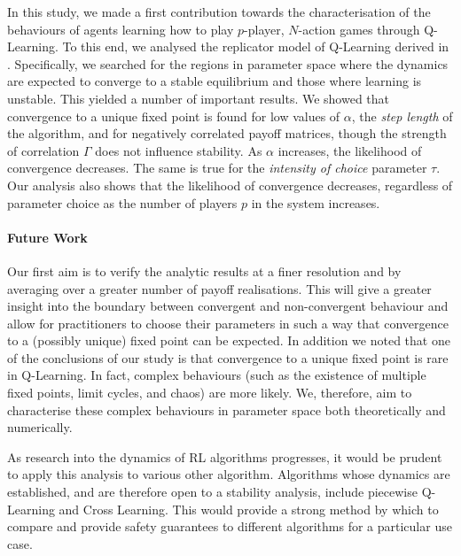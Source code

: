 \documentclass[sigconf,anonymous]{aamas}
\begin{document}
In this study, we made a first contribution towards the
characterisation of the behaviours of agents learning how to play
$p$-player, $N$-action games through Q-Learning. To this end, we
analysed the replicator model of Q-Learning derived in \cite{Tuyls2006AnGames}. Specifically, we searched for the regions in parameter space
where the dynamics are expected to converge to a stable equilibrium
and those where learning is unstable. This yielded a number of
important results. We showed that convergence to a unique fixed point is
found for low values of $\alpha$, the \textit{step length} of the
algorithm, and for negatively correlated payoff matrices, though the
strength of correlation $\Gamma$ does not influence stability. As
$\alpha$ increases, the likelihood of convergence decreases. The same
is true for the \textit{intensity of choice} parameter $\tau$. Our
analysis also shows that the likelihood of convergence decreases,
regardless of parameter choice as the number of players $p$ in the
system increases.

\paragraph{Future Work}
Our first aim is to verify the analytic results at a finer resolution
and by averaging over a greater number of payoff realisations. This
will give a greater insight into the boundary between convergent and
non-convergent behaviour and allow for practitioners to choose their
parameters in such a way that convergence to a (possibly unique) fixed
point can be expected. In addition we noted that one of the conclusions of
our study is that convergence to a unique fixed point is rare in
Q-Learning. In fact, complex behaviours (such as the existence of
multiple fixed points, limit cycles, and chaos) are more likely. We,
therefore, aim to characterise these complex behaviours in parameter
space both theoretically and numerically.

As
research into the dynamics of RL algorithms
progresses, it would be prudent to apply this analysis to various
other algorithm. Algorithms whose dynamics are established, and are
therefore open to a stability analysis, include piecewise Q-Learning
and Cross Learning. This would provide a strong method by which to
compare and provide safety guarantees to different algorithms for a
particular use case.
\end{document}
